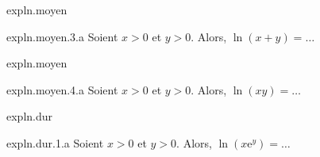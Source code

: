 \begin{qcm}{expln.moyen}
    \begin{question}{expln.moyen.3.a}
         Soient \(x>0\) et \(y>0\). Alors, \(\ln(x+y)=\ldots\)
         \vspace{-1.5ex}
         \begin{multicols}{2}
         \begin{reponses}
            \lastchoices
         \end{reponses}
         \end{multicols}
    \end{question}
\end{qcm}

\begin{qcm}{expln.moyen}
    \begin{question}{expln.moyen.4.a}
         Soient \(x>0\) et \(y>0\). Alors, \(\ln(xy)=\ldots\)
         \vspace{-1.5ex}
         \begin{multicols}{2}
         \begin{reponses}
            \lastchoices
         \end{reponses}
         \end{multicols}
    \end{question}
\end{qcm}




\begin{qcm}{expln.dur}
    \begin{question}{expln.dur.1.a}
         Soient \(x>0\) et \(y>0\). Alors, \(\ln\left(x\mathrm{e}^y\right)=\ldots\)
         \vspace{-1.5ex}
         \begin{multicols}{3}
         \begin{reponses}
         \end{reponses}
         \end{multicols}
    \end{question}
\end{qcm}


